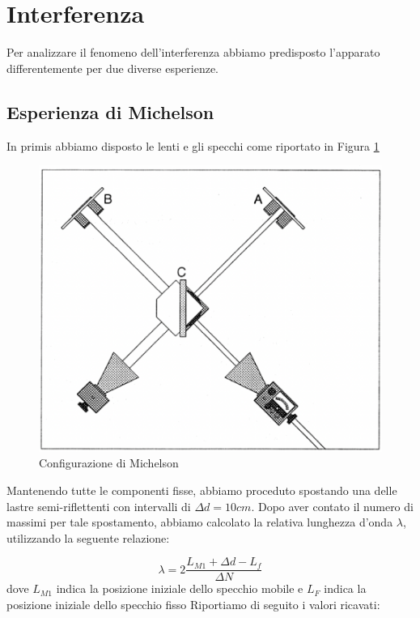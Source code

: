 \section{Interferenza}
Per analizzare il fenomeno dell'interferenza abbiamo predisposto l'apparato differentemente per due diverse esperienze.

\subsection{Esperienza di Michelson}
In primis abbiamo disposto le lenti e gli specchi come riportato in Figura \ref{michelino}

\begin{figure}[h!]
    \centering
    \includegraphics[scale=.35]{Immagini/michelino.png}
    \caption{Configurazione di Michelson}
    \label{michelino}
\end{figure}
\noindent
Mantenendo tutte le componenti fisse, abbiamo proceduto spostando una delle lastre semi-riflettenti con intervalli di $\Delta d = 10 cm$. Dopo aver contato il numero di massimi per tale spostamento, abbiamo calcolato la relativa lunghezza d'onda $\lambda$, utilizzando la seguente relazione:

\begin{equation}
    \lambda=2\dfrac{L_{M1} + \Delta d - L_f}{\Delta N}
\end{equation}
dove $L_{M1}$ indica la posizione iniziale dello specchio mobile e $L_F$ indica la posizione iniziale dello specchio fisso
\noindent
Riportiamo di seguito i valori ricavati:

